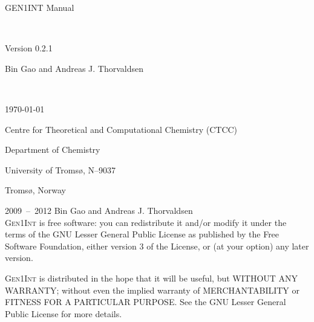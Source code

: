 \documentclass[a4paper,11pt,twoside,openright]{book}
\begin{document}
\frontmatter
\pagestyle{empty}

\vspace*{\fill}
\begin{center}
  \begin{Huge}\textsf{G{\huge EN}1I{\huge NT} Manual}\end{Huge}\\[0.5\baselineskip]
  \begin{LARGE}\textsf{Version 0.2.1}\end{LARGE}
\end{center}

\vspace*{\fill}
\begin{center}
  \begin{huge}\textsf{Bin Gao and Andreas J. Thorvaldsen}\end{huge}\\[0.5\baselineskip]
  \begin{LARGE}\textsf{\today}\end{LARGE}
\end{center}

\vspace*{\fill}
\begin{center}
  \begin{large}
    \textsf{Centre for Theoretical and Computational Chemistry (CTCC)}\par
    \textsf{Department of Chemistry}\par
    \textsf{University of Troms{\o}, N--9037}\par
    \textsf{Troms{\o}, Norway}\\[0.5\baselineskip]
  \end{large}
\end{center}

\clearpage

\begingroup
\footnotesize
\setlength{\parindent}{0pt}
\setlength{\parskip}{\baselineskip}
\textcopyright{} 2009~--~2012 Bin Gao and Andreas J. Thorvaldsen\\

\textsc{Gen1Int} is free software: you can redistribute it and/or modify
it under the terms of the GNU Lesser General Public License as published by
the Free Software Foundation, either version 3 of the License, or
(at your option) any later version.

\textsc{Gen1Int} is distributed in the hope that it will be useful,
but WITHOUT ANY WARRANTY; without even the implied warranty of
MERCHANTABILITY or FITNESS FOR A PARTICULAR PURPOSE. See the
GNU Lesser General Public License for more details.
\end{document}
